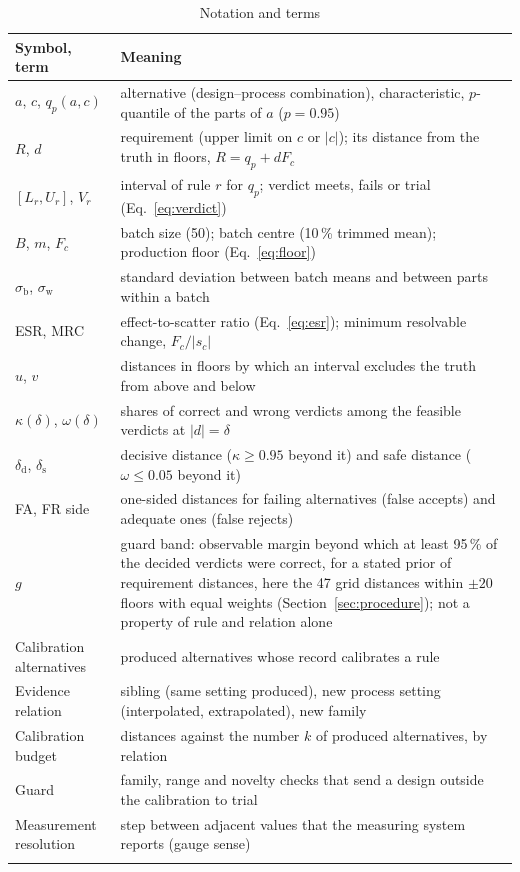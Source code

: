 \documentclass[pdflatex,sn-basic,lineno]{sn-jnl}
\newcommand{\tabsize}{\fontsize{8}{9.5}\selectfont}
\begin{document}
\begin{appendices}
\begin{table}[!ht]
\tabsize
\setlength{\tabcolsep}{4pt}
\caption{Notation and terms}\label{tab:notation}
\begin{tabular}{@{}L{2.55cm}L{10.2cm}@{}}
\toprule
Symbol, term & Meaning \\
\midrule
$a$, $c$, $q_p(a,c)$ & alternative (design--process combination), characteristic, $p$-quantile of the parts of $a$ ($p=0.95$) \\
$R$, $d$ & requirement (upper limit on $c$ or $|c|$); its distance from the truth in floors, $R=q_p+dF_c$ \\
$[L_r,U_r]$, $V_r$ & interval of rule $r$ for $q_p$; verdict meets, fails or trial (Eq.~\ref{eq:verdict}) \\
$B$, $m$, $F_c$ & batch size (50); batch centre (10\,\% trimmed mean); production floor (Eq.~\ref{eq:floor}) \\
$\sigma_\mathrm{b}$, $\sigma_\mathrm{w}$ & standard deviation between batch means and between parts within a batch \\
ESR, MRC & effect-to-scatter ratio (Eq.~\ref{eq:esr}); minimum resolvable change, $F_c/|s_c|$ \\
$u$, $v$ & distances in floors by which an interval excludes the truth from above and below \\
$\kappa(\delta)$, $\omega(\delta)$ & shares of correct and wrong verdicts among the feasible verdicts at $|d|=\delta$ \\
$\delta_\mathrm{d}$, $\delta_\mathrm{s}$ & decisive distance ($\kappa\ge0.95$ beyond it) and safe distance ($\omega\le0.05$ beyond it) \\
FA, FR side & one-sided distances for failing alternatives (false accepts) and adequate ones (false rejects) \\
$g$ & guard band: observable margin beyond which at least 95\,\% of the decided verdicts were correct, for a stated prior of requirement distances, here the 47 grid distances within $\pm20$ floors with equal weights (Section~\ref{sec:procedure}); not a property of rule and relation alone \\
Calibration alternatives & produced alternatives whose record calibrates a rule \\
Evidence relation & sibling (same setting produced), new process setting (interpolated, extrapolated), new family \\
Calibration budget & distances against the number $k$ of produced alternatives, by relation \\
Guard & family, range and novelty checks that send a design outside the calibration to trial \\
Measurement resolution & step between adjacent values that the measuring system reports (gauge sense) \\
\botrule
\end{tabular}
\end{table}


\end{appendices}
\end{document}
